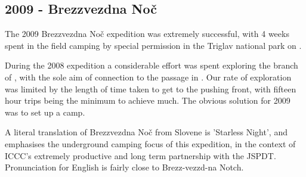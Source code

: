 \begin{tcolorbox}
\chapter{2009 - Brezzvezdna Noč}

The 2009 Brezzvezdna Noč expedition was extremely successful, with 4
weeks spent in the field camping by special permission in the Triglav
national park on . 

During the 2008 expedition a considerable effort was spent exploring the
 branch of , with the sole aim of
connection to the passage in . Our rate of exploration was
limited by the length of time taken to get to the pushing front, with
fifteen hour trips being the minimum to achieve much. The obvious
solution for 2009 was to set up a camp.

A literal translation of Brezzvezdna Noč from Slovene is 'Starless Night', and emphasises the underground camping focus of this expedition, in the context of ICCC's extremely productive and long term partnership with the JSPDT. Pronunciation for English is fairly close to Brezz-vezzd-na Notch.

\end{tcolorbox}
\BgThispage









